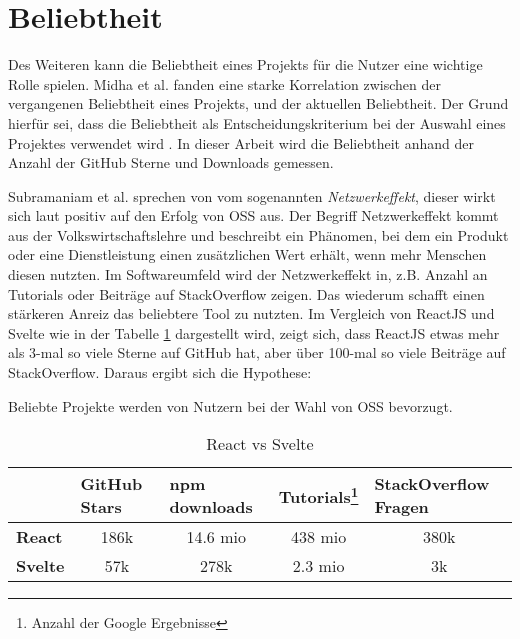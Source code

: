 \section{Beliebtheit}

Des Weiteren kann die Beliebtheit eines Projekts für die Nutzer eine wichtige Rolle spielen. 
Midha et al. fanden eine starke Korrelation zwischen der vergangenen Beliebtheit 
eines Projekts, und der aktuellen Beliebtheit. Der Grund hierfür sei, dass die Beliebtheit
als Entscheidungskriterium bei der Auswahl eines Projektes verwendet wird
\cite{midhaFactorsAffectingSuccess2012}. %
In dieser Arbeit wird die Beliebtheit anhand der Anzahl der GitHub Sterne und Downloads gemessen.

Subramaniam et al. sprechen von vom sogenannten \textit{Netzwerkeffekt},
dieser wirkt sich laut \cite{subramaniamDeterminantsOpenSource2009} %
positiv auf den Erfolg von OSS aus.
Der Begriff Netzwerkeffekt kommt aus der Volkswirtschaftslehre und beschreibt ein Phänomen,
bei dem ein Produkt oder eine Dienstleistung einen zusätzlichen Wert erhält, wenn mehr Menschen
diesen nutzten.
Im Softwareumfeld wird der Netzwerkeffekt in, z.B. Anzahl an Tutorials
oder Beiträge auf StackOverflow zeigen.
Das wiederum schafft einen stärkeren Anreiz das beliebtere Tool zu nutzten.
Im Vergleich von ReactJS und Svelte wie in der Tabelle \ref{tab:react_vs_svelte} dargestellt wird, 
zeigt sich, dass ReactJS etwas mehr als 3-mal so viele Sterne auf GitHub hat, aber über 100-mal so viele 
Beiträge auf StackOverflow. 
Daraus ergibt sich die Hypothese:

\begin{hypothesis}
    Beliebte Projekte werden von Nutzern bei der Wahl von OSS bevorzugt.
    \label{H:9}
\end{hypothesis}


\begin{table}[h]
    \begin{tabular}{lcccc}
        \hline
                        & \multicolumn{1}{l}{\textbf{GitHub Stars}} & \multicolumn{1}{l}{\textbf{npm downloads}} & \multicolumn{1}{l}{\textbf{Tutorials}\footnote{Anzahl der Google Ergebnisse}} & \multicolumn{1}{l}{\textbf{StackOverflow Fragen}} \\ \hline
        \textbf{React}  & 186k                                      & 14.6 mio                                   & 438 mio                                                                       & 380k                                              \\
        \textbf{Svelte} & 57k                                       & 278k                                       & 2.3 mio                                                                       & 3k
    \end{tabular}%
    \caption{React vs Svelte}
    \label{tab:react_vs_svelte}
\end{table}